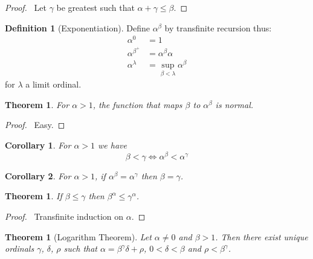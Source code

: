 \documentclass{article}
\let\qed\relax
\newtheorem{theorem}[axiom]{Theorem}
\newtheorem{corollary}{Corollary}[axiom]
\theoremstyle{definition}
\newtheorem{definition}[axiom]{Definition}
\begin{document}
    \begin{proof}
        \pf\ Let $\gamma$ be greatest such that $\alpha + \gamma \leq \beta$. \qed
    \end{proof}

    \begin{definition}[Exponentiation]
        Define $\alpha^\beta$ by transfinite recursion thus:
        \begin{align*}
            \alpha^0 & = 1 \\
            \alpha^{\beta^+} & = \alpha^\beta \alpha \\
            \alpha^\lambda & = \sup_{\beta < \lambda} \alpha^\beta
        \end{align*}
        for $\lambda$ a limit ordinal.
    \end{definition}

    \begin{theorem}
        For $\alpha > 1$, the function that maps $\beta$ to $\alpha^\beta$ is normal.
    \end{theorem}

    \begin{proof}
        \pf\ Easy. \qed
    \end{proof}

    \begin{corollary}
        For $\alpha > 1$ we have
        \[ \beta < \gamma \Leftrightarrow \alpha^\beta < \alpha^\gamma \]
    \end{corollary}
    
    \begin{corollary}
        For $\alpha > 1$, if $\alpha^\beta = \alpha^\gamma$ then $\beta = \gamma$.
    \end{corollary}

    \begin{theorem}
        If $\beta \leq \gamma$ then $\beta ^ \alpha \leq \gamma ^ \alpha$.
    \end{theorem}

    \begin{proof}
        \pf\ Transfinite induction on $\alpha$. \qed
    \end{proof}

    \begin{theorem}[Logarithm Theorem]
        Let $\alpha \neq 0$ and $\beta > 1$. Then there exist unique ordinals $\gamma$, $\delta$,
        $\rho$ such that $\alpha = \beta^\gamma \delta + \rho$, $0 < \delta < \beta$ and $\rho < \beta^\gamma$.
    \end{theorem}
\end{document}
